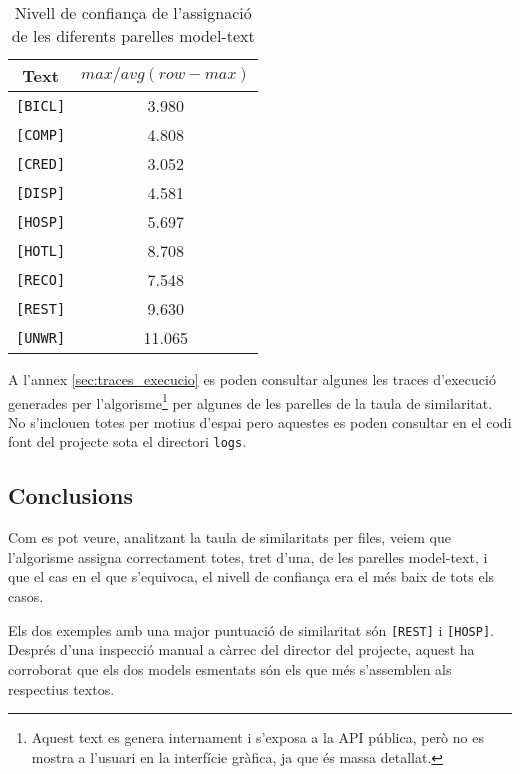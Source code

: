 \begin{table}[htbp]
    \centering
    \begin{tabular}{|c||c|} \hline
        Text & \multicolumn{1}{c|}{$max / avg(row - max)$}\\ \hline\hline
        \texttt{[BICL]} & 3.980 \\ \hline
        \texttt{[COMP]} & 4.808 \\ \hline
        \texttt{[CRED]} & 3.052 \\ \hline
        \texttt{[DISP]} & 4.581 \\ \hline
        \texttt{[HOSP]} & 5.697 \\ \hline
        \texttt{[HOTL]} & 8.708 \\ \hline
        \texttt{[RECO]} & 7.548 \\ \hline
        \texttt{[REST]} & 9.630 \\ \hline
        \texttt{[UNWR]} & 11.065\\ \hline
    \end{tabular}
    \caption{Nivell de confiança de l'assignació de les diferents parelles model-text}
    \label{tab:experiment2-result3}
\end{table}

A l'annex \ref{sec:traces_execucio} es poden consultar algunes les traces d'execució generades per l'algorisme\footnote{Aquest text es genera internament i s'exposa a la API pública, però no es mostra a l'usuari en la interfície gràfica, ja que és massa detallat.} per algunes de les parelles de la taula de similaritat. No s'inclouen totes per motius d'espai pero aquestes es poden consultar en el codi font del projecte sota el directori \texttt{logs}.

\subsection{Conclusions}

Com es pot veure, analitzant la taula de similaritats per files, veiem que l'algorisme assigna correctament totes, tret d'una, de les parelles model-text, i que el cas en el que s'equivoca, el nivell de confiança era el més baix de tots els casos. 

Els dos exemples amb una major puntuació de similaritat són \texttt{[REST]} i \texttt{[HOSP]}. Després d'una inspecció manual a càrrec del director del projecte, aquest ha corroborat que els dos models esmentats són els que més s'assemblen als respectius textos. 

